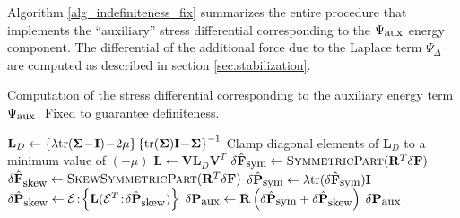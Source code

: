 Algorithm \ref{alg_indefiniteness_fix}
summarizes the entire procedure that implements the ``auxiliary'' stress differential corresponding to the $\Psi_{\mbox{\small aux}}$ energy component. The differential of the
additional force due to the Laplace term $\Psi_\Delta$ are computed as described in section \ref{sec:stabilization}.
\begin{algorithm}[h]
\caption{Computation of the stress differential corresponding to the auxiliary energy term $\Psi_{\mbox{\small aux}}$. Fixed to guarantee definiteness.}
\label{alg_indefiniteness_fix}
\begin{algorithmic}[1]
\State $\mathbf{L}_D\gets\left\{\lambda\mbox{tr}(\mathbf{\Sigma}\!-\!\mathbf{I})\!-\!2\mu\right\}\left\{\mbox{tr}(\mathbf{\Sigma})\mathbf{I}\!-\!\mathbf{\Sigma}\right\}^{-1}$
\State Clamp diagonal elements of $\mathbf{L}_D$ to a minimum value
of $(-\mu)$
\State $\mathbf{L}\gets\mathbf{V}\mathbf{L}_D\mathbf{V}^T$
\EndFunction
{}
\State $\delta\hat{\mathbf{F}}_{\mbox{\small sym}}\gets\Call{SymmetricPart}{\mathbf{R}^T\delta\mathbf{F}}$
\State $\delta\hat{\mathbf{F}}_{\mbox{\small skew}}\gets\Call{SkewSymmetricPart}{\mathbf{R}^T\delta\mathbf{F}}$
\State $\delta\hat{\mathbf{P}}_{\mbox{\small sym}}\gets\lambda\mbox{tr}(\delta\hat{\mathbf{F}}_{\mbox{\small sym}})\mathbf{I}$
\State $\delta\hat{\mathbf{P}}_{\mbox{\small skew}}\gets\mathcal{E}\!:\!\left\{\mathbf{L}(\mathcal{E}^T\!:\!\delta\hat{\mathbf{P}}_{\mbox{\small skew}})\right\}$
\State $\delta\mathbf{P}_{\mbox{\small aux}}\gets\mathbf{R}\left(\delta\hat{\mathbf{P}}_{\mbox{\small sym}}+\delta\hat{\mathbf{P}}_{\mbox{\small skew}}\right)$
\State \Return $\delta\mathbf{P}_{\mbox{\small aux}}$
\EndFunction
\end{algorithmic}
\end{algorithm}



